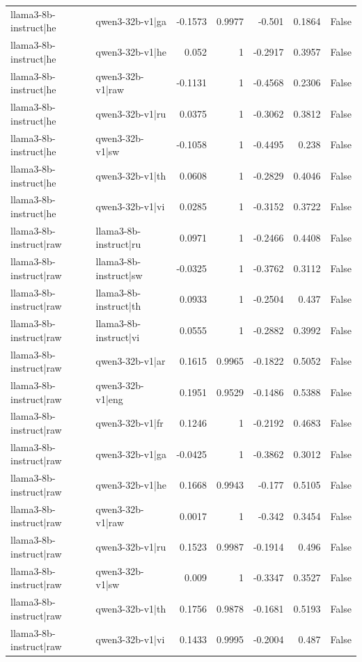 \begin{table}
\begin{tabular}{l l r r r r l}
llama3-8b-instruct|he & qwen3-32b-v1|ga & -0.1573 & 0.9977 & -0.501 & 0.1864 & False \\
llama3-8b-instruct|he & qwen3-32b-v1|he & 0.052 & 1 & -0.2917 & 0.3957 & False \\
llama3-8b-instruct|he & qwen3-32b-v1|raw & -0.1131 & 1 & -0.4568 & 0.2306 & False \\
llama3-8b-instruct|he & qwen3-32b-v1|ru & 0.0375 & 1 & -0.3062 & 0.3812 & False \\
llama3-8b-instruct|he & qwen3-32b-v1|sw & -0.1058 & 1 & -0.4495 & 0.238 & False \\
llama3-8b-instruct|he & qwen3-32b-v1|th & 0.0608 & 1 & -0.2829 & 0.4046 & False \\
llama3-8b-instruct|he & qwen3-32b-v1|vi & 0.0285 & 1 & -0.3152 & 0.3722 & False \\
llama3-8b-instruct|raw & llama3-8b-instruct|ru & 0.0971 & 1 & -0.2466 & 0.4408 & False \\
llama3-8b-instruct|raw & llama3-8b-instruct|sw & -0.0325 & 1 & -0.3762 & 0.3112 & False \\
llama3-8b-instruct|raw & llama3-8b-instruct|th & 0.0933 & 1 & -0.2504 & 0.437 & False \\
llama3-8b-instruct|raw & llama3-8b-instruct|vi & 0.0555 & 1 & -0.2882 & 0.3992 & False \\
llama3-8b-instruct|raw & qwen3-32b-v1|ar & 0.1615 & 0.9965 & -0.1822 & 0.5052 & False \\
llama3-8b-instruct|raw & qwen3-32b-v1|eng & 0.1951 & 0.9529 & -0.1486 & 0.5388 & False \\
llama3-8b-instruct|raw & qwen3-32b-v1|fr & 0.1246 & 1 & -0.2192 & 0.4683 & False \\
llama3-8b-instruct|raw & qwen3-32b-v1|ga & -0.0425 & 1 & -0.3862 & 0.3012 & False \\
llama3-8b-instruct|raw & qwen3-32b-v1|he & 0.1668 & 0.9943 & -0.177 & 0.5105 & False \\
llama3-8b-instruct|raw & qwen3-32b-v1|raw & 0.0017 & 1 & -0.342 & 0.3454 & False \\
llama3-8b-instruct|raw & qwen3-32b-v1|ru & 0.1523 & 0.9987 & -0.1914 & 0.496 & False \\
llama3-8b-instruct|raw & qwen3-32b-v1|sw & 0.009 & 1 & -0.3347 & 0.3527 & False \\
llama3-8b-instruct|raw & qwen3-32b-v1|th & 0.1756 & 0.9878 & -0.1681 & 0.5193 & False \\
llama3-8b-instruct|raw & qwen3-32b-v1|vi & 0.1433 & 0.9995 & -0.2004 & 0.487 & False \\

\end{tabular}
\end{table}
